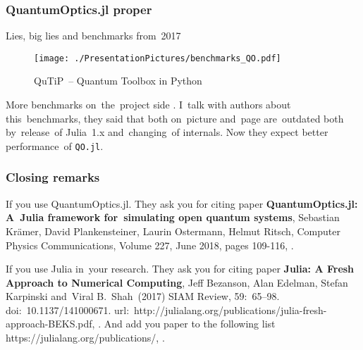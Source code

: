 \documentclass[10pt,t]{beamer}
\begin{document}
\begin{frame}
  \frametitle{QuantumOptics.jl proper}


  Lies, big lies and benchmarks from~2017
  \begin{figure}

    \centering

    \texttt{[image: ./PresentationPictures/benchmarks\_QO.pdf]}


    \caption{QuTiP~-- Quantum Toolbox in Python}

  \end{figure}



  More benchmarks on~the~project side
  . I~talk
  with authors about this~benchmarks, they said that both on~picture
  and~page are~outdated both by~release~of Julia~1.x and~changing~of
  internals. Now they expect better performance~of \texttt{QO.jl}.

\end{frame}





\begin{frame}
  \frametitle{Closing remarks}


  If you use QuantumOptics.jl. They ask you for citing paper
  \textbf{QuantumOptics.jl: A~Julia framework for~simulating open quantum
    systems}, Sebastian Kr\"{a}mer, David Plankensteiner, Laurin Ostermann,
  Helmut Ritsch, Computer Physics Communications, Volume 227, June 2018,
  pages 109-116,
  .

  If you use Julia in~your research. They ask you for citing paper
  \textbf{Julia: A Fresh Approach to Numerical Computing}, Jeff Bezanson,
  Alan Edelman, Stefan Karpinski and~Viral B.~Shah~(2017) SIAM Review,
  59:~65--98. doi:~10.1137/141000671.
  url:~http://julialang.org/publications/julia-fresh-approach-BEKS.pdf,
  .
  And add you paper to the following list
  https://julialang.org/publications/,
  .

\end{frame}
\end{document}
